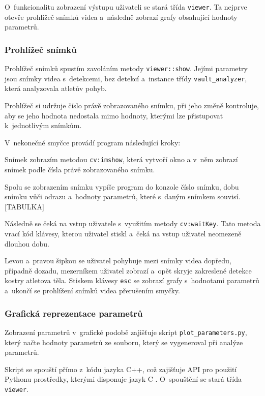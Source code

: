 O~funkcionalitu zobrazení výstupu uživateli se stará třída \texttt{viewer}. Ta nejprve otevře prohlížeč snímků videa a~následně zobrazí grafy obsahující hodnoty parametrů.


\subsubsection{Prohlížeč snímků}

Prohlížeč snímků spustím zavoláním metody \texttt{viewer::show}. Jejími parametry jsou snímky videa s~detekcemi, bez detekcí a~instance třídy \texttt{vault\_analyzer}, která analyzovala atletův pohyb.

Prohlížeč si udržuje číslo právě zobrazovaného snímku, při jeho změně kontroluje, aby se jeho hodnota nedostala mimo hodnoty, kterými lze přistupovat k~jednotlivým snímkům.

V~nekonečné smyčce provádí program následující kroky:

Snímek zobrazím metodou \texttt{cv\::imshow}, která vytvoří okno a v~něm zobrazí snímek podle čísla právě zobrazovaného snímku.

Spolu se zobrazením snímku vypíše program do konzole číslo snímku, dobu snímku vůči odrazu a~hodnoty parametrů, které s~daným snímkem souvisí. [TABULKA]

Následně se čeká na vstup uživatele s~využitím metody \texttt{cv\::waitKey}. Tato metoda vrací kód klávesy, kterou uživatel stiskl a~čeká na vstup uživatel neomezeně dlouhou dobu.

Levou a~pravou šipkou se uživatel pohybuje mezi snímky videa dopředu, případně dozadu, mezerníkem uživatel zobrazí a~opět skryje zakreslené detekce kostry atletova těla. Stiskem klávesy \texttt{esc} se zobrazí grafy s~hodnotami parametrů a~ukončí se prohlížení snímků videa přerušením smyčky.


\subsubsection{Grafická reprezentace parametrů}

Zobrazení parametrů v~grafické podobě zajišťuje skript \texttt{plot\_parameters.py}, který načte hodnoty parametrů ze souboru, který se vygeneroval při analýze parametrů.

Skript se spouští přímo z~kódu jazyka C++, což zajišťuje API pro použití Pythonu prostředky, kterými disponuje jazyk C \citep{PythonC}. O~spouštění se stará třída \texttt{viewer}.


